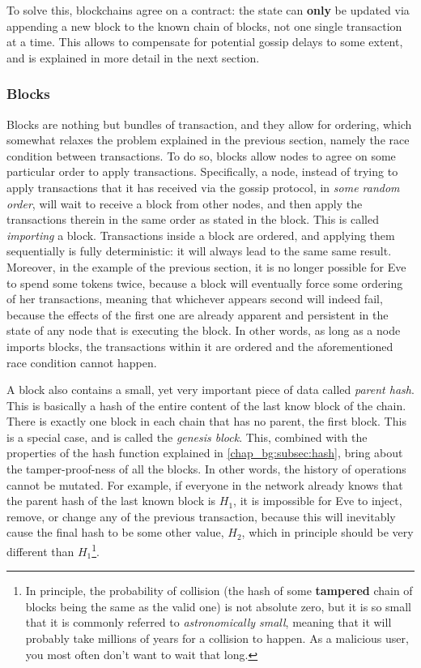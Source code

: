 To solve this, blockchains agree on a contract: the state can \textbf{only} be updated via appending
a new block to the known chain of blocks, not one single transaction at a time. This allows to
compensate for potential gossip delays to some extent, and is explained in more detail in the
next section.

\subsubsection{Blocks} \label{chap_bg:subsec:block}

Blocks are nothing but bundles of transaction, and they allow for ordering, which
somewhat relaxes the problem explained in the previous section, namely the race condition between transactions. To do so, blocks allow nodes to
agree on some particular order to apply transactions. Specifically, a node, instead of trying to
apply transactions that it has received via the gossip protocol, in \textit{some random order}, will wait to
receive a block from other nodes, and then apply the transactions therein in the same order as stated in the block. This is called \textit{importing} a block.
Transactions inside a block are ordered, and applying them sequentially is fully deterministic: it
will always lead to the same same result. Moreover, in the example of the previous section, it is no
longer possible for Eve to spend some tokens twice, because a block will eventually force some
ordering of her transactions, meaning that whichever appears second will indeed fail, because
the effects of the first one are already apparent and persistent in the state of any node that is
executing the block. In other words, as long as a node imports blocks, the transactions within it are ordered and the aforementioned race condition cannot happen.

A block also contains a small, yet very important piece of data called \textit{parent hash}. This is
basically a hash of the entire content of the last know block of the chain. There is exactly one
block in each chain that has no parent, the first block. This is a special case, and is called the
\textit{genesis block}. This, combined with the properties of the hash function explained in
\ref{chap_bg:subsec:hash}, bring about the tamper-proof-ness of all the blocks. In other words, the
history of operations cannot be mutated. For example, if everyone in the network already knows that
the parent hash of the last known block is $H_1$, it is impossible for Eve to inject, remove, or
change any of the previous transaction, because this will inevitably cause the final hash to be some
other value, $H_2$, which in principle should be very different than $H_1$\footnote{In principle,
the probability of collision (the hash of some \textbf{tampered} chain of blocks being the same as
the valid one) is not absolute zero, but it is so small that it is commonly referred to
\textit{astronomically small}, meaning that it will probably take millions of years for a collision
to happen. As a malicious user, you most often don't want to wait that long.}.

